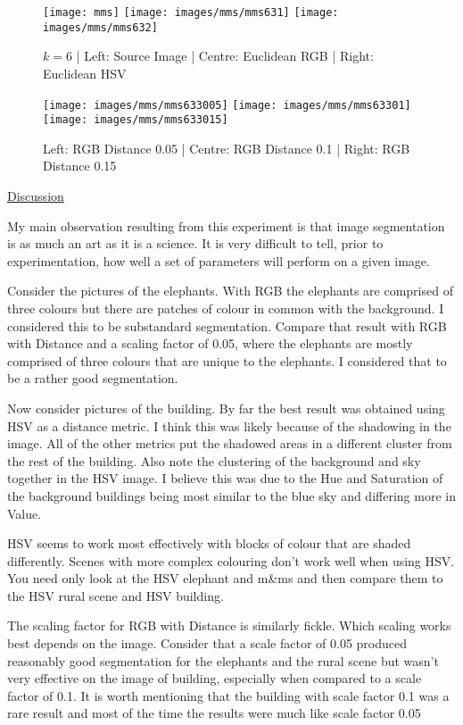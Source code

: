 \documentclass{article}
\begin{document}
\begin{figure}[H]
\begin{center}
\texttt{[image: mms]}
\texttt{[image: images/mms/mms631]}
\texttt{[image: images/mms/mms632]}
\caption{$k = 6$ | Left: Source Image | Centre: Euclidean RGB | Right: Euclidean HSV }
\texttt{[image: images/mms/mms633005]}
\texttt{[image: images/mms/mms63301]}
\texttt{[image: images/mms/mms633015]}
\caption{Left: RGB Distance 0.05 | Centre: RGB Distance 0.1 | Right: RGB Distance 0.15 }
\end{center}
\end{figure}

\underline{Discussion}

My main observation resulting from this experiment is that image segmentation is as much an art as it is a science. It is very difficult to tell, prior to experimentation, how well a set of parameters will perform on a given image. 

Consider the pictures of the elephants. With RGB the elephants are comprised of three colours but there are patches of colour in common with the background. I considered this to be substandard segmentation. Compare that result with RGB with Distance and a scaling factor of 0.05, where the elephants are mostly comprised of three colours that are unique to the elephants. I considered that to be a rather good segmentation. 

Now consider pictures of the building. By far the best result was obtained using HSV as a distance metric. I think this was likely because of the shadowing in the image. All of the other metrics put the shadowed areas in a different cluster from the rest of the building. Also note the clustering of the background and sky together in the HSV image. I believe this was due to the Hue and Saturation of the background buildings being most similar to the blue sky and differing more in Value.

HSV seems to work most effectively with blocks of colour that are shaded differently. Scenes with more complex colouring don't work well when using HSV. You need only look at the HSV elephant and m\&ms and then compare them to the HSV rural scene and HSV building. 

The scaling factor for RGB with Distance is similarly fickle. Which scaling works best depends on the image. Consider that a scale factor of 0.05 produced reasonably good segmentation for the elephants and the rural scene but wasn't very effective on the image of building, especially when compared to a scale factor of 0.1. It is worth mentioning that the building with scale factor 0.1 was a rare result and most of the time the results were much like scale factor 0.05
\end{document}
